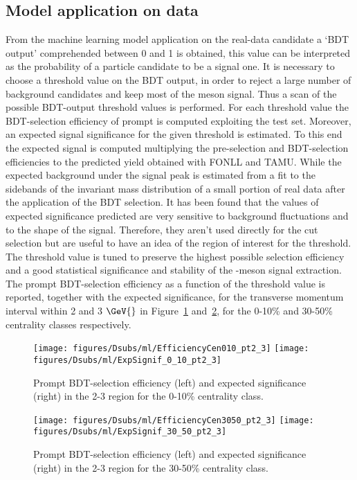 \subsection{Model application on data}
From the machine learning model application on the real-data candidate a `BDT output' comprehended between 0 and 1 is obtained,
this value can be interpreted as the probability of a particle candidate to be a signal one. It is necessary to choose a 
threshold value on the BDT output, in order to reject a large number of background candidates and keep most of the \Dsubs{} meson signal. 
Thus a scan of the possible BDT-output threshold values is performed. 
For each threshold value the BDT-selection efficiency of prompt \Dsubs{} is computed exploiting the test set. 
Moreover, an expected signal significance for the given threshold is estimated. To this end the expected signal is computed 
multiplying the pre-selection and BDT-selection efficiencies to the predicted yield obtained with FONLL and TAMU. 
While the expected background under the signal peak is estimated from a fit to the sidebands of the invariant mass distribution of 
a small portion of real data after the application of the BDT selection. It has been found that the values of expected significance
predicted are very sensitive to background fluctuations and to the \pt{} shape of the signal. Therefore, they aren't used directly for the 
cut selection but are useful to have an idea of the region of interest for the threshold. \\
The threshold value is tuned to preserve the highest possible selection efficiency and a good statistical significance and stability of the \Dsubs{}-meson signal extraction. 
The prompt BDT-selection efficiency as a function of the threshold value is reported, together with the expected significance, 
for the transverse momentum interval within 2 and 3 \(\GeV{}\) in Figure~\ref{fig:effsig_pt2_3_010} and~\ref{fig:effsig_pt2_3_3050}, for the 0-10\% and 30-50\% centrality classes respectively.
\begin{figure}[htbp]
  \begin{center}
   \texttt{[image: figures/Dsubs/ml/EfficiencyCen010\_pt2\_3]}
   \texttt{[image: figures/Dsubs/ml/ExpSignif\_0\_10\_pt2\_3]} 
  \caption{Prompt BDT-selection efficiency (left) and expected significance (right) in the 2-3 \pt{} region for the 0-10\% centrality class.}
  \label{fig:effsig_pt2_3_010}
  \end{center}
\end{figure}
\begin{figure}[htbp]
  \begin{center}
    \texttt{[image: figures/Dsubs/ml/EfficiencyCen3050\_pt2\_3]}
    \texttt{[image: figures/Dsubs/ml/ExpSignif\_30\_50\_pt2\_3]} 
  \caption{Prompt BDT-selection efficiency (left) and expected significance (right) in the 2-3 \pt{} region for the 30-50\% centrality class.}
  \label{fig:effsig_pt2_3_3050}
  \end{center}
\end{figure}

